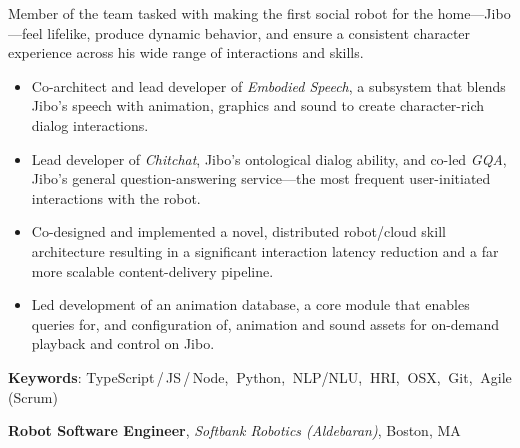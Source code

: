 \documentclass[10pt, letter]{article}
\newcommand{\years}[1]{\marginnote{\footnotesize #1}}
\newenvironment{desc*}{
  \begin{description}
    \setlength{\itemsep}{0.2pt}
    \setlength{\parskip}{-1pt}
    \setlength{\parsep}{0pt}
  }{
  \end{description}
}
\begin{document}
\vspace{-.3cm}
Member of the team tasked with making the first social robot for the home---Jibo---feel lifelike, produce dynamic behavior, and ensure a consistent character experience across his wide range of interactions and skills.
\begin{itemize}[leftmargin=*, parsep=-1pt]
\item Co-architect and lead developer of \textit{Embodied Speech}, a subsystem that blends Jibo's speech with animation, graphics and sound to create character-rich dialog interactions.
\item Lead developer of \textit{Chitchat}, Jibo's ontological dialog ability, and co-led \textit{GQA}, Jibo's general question-answering service---the most frequent user-initiated interactions with the robot.
\item Co-designed and implemented a novel, distributed robot/cloud skill architecture resulting in a significant interaction latency reduction and a far more scalable content-delivery pipeline.
\item Led development of an animation database, a core module that enables queries for, and configuration of, animation and sound assets for on-demand playback and control on Jibo.
\end{itemize}
\vspace{-.2cm}
\begin{desc*}
\item[\rm \color{redblue} \textbf{Keywords}:] TypeScript\,/\,JS\,/\,Node,$\:$ Python,$\:$ NLP/NLU,$\:$ HRI,$\:$ OSX,$\:$ Git,$\:$ Agile (Scrum)\\
\end{desc*}

\years{2014 - 2016} 
\textbf{\fontsize{10.5pt}{1em}\selectfont Robot Software Engineer},
\textit{Softbank Robotics (Aldebaran)}, Boston, MA\\
\end{document}
